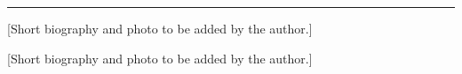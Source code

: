 \begin{center}
\rule{6 cm}{0.02 cm}
\end{center}

 [Short biography and photo to be added by the author.]

\medskip
{} [Short biography and photo to be added by the author.]
